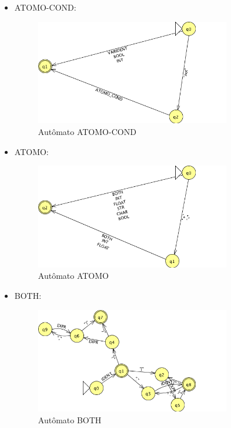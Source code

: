 
\begin{itemize}

	\item ATOMO-COND:
	\begin{figure}[H]
		\centering 
		\includegraphics[width=0.8\textwidth]{images/submaquinas/ATOMO-COND.png}  
		\caption{Autômato ATOMO-COND}
	\end{figure}
	
	\item ATOMO:
	\begin{figure}[H]
		\centering 
		\includegraphics[width=0.8\textwidth]{images/submaquinas/ATOMO.png}  
		\caption{Autômato ATOMO}
	\end{figure}
	
	\item BOTH:
	\begin{figure}[H]
		\centering 
		\includegraphics[width=0.8\textwidth]{images/submaquinas/BOTH.png}  
		\caption{Autômato BOTH}
	\end{figure}
	

\end{itemize}
